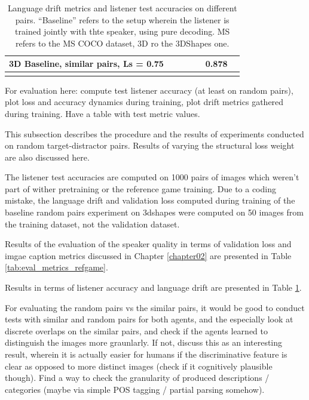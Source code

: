 \begin{table}[]
\begin{tabularx}{\textwidth}{|X|l|l|X|X|X|X|}
		3D Baseline, similar pairs, Ls = 0.75 &                   &                        &                      &                      & 0.878                                    &                                           \\ \hline
		&                   &                        &                      &                      &                                          &                                           \\ \hline
	\end{tabularx}
\caption{\label{tab:drift_metrics_basic} Language drift metrics and listener test accuracies on different pairs. 
	``Baseline'' refers to the setup wherein the listener is trained jointly with thte speaker, using pure decoding. MS refers to the MS COCO dataset, 3D ro the 3DShapes one. }
\end{table}

For evaluation here: compute test listener accuracy (at least on random pairs), plot loss and accuracy dynamics during training, plot drift metrics gathered during training. Have a table with test metric values.

This subsection describes the procedure and the results of experiments conducted on random target-distractor pairs. Results of varying the structural loss weight are also discussed here.

The listener test accuracies are computed on 1000 pairs of images which weren't part of wither pretraining or the reference game training.
Due to a coding mistake, the language drift and validation loss computed during training of the baseline random pairs experiment on 3dshapes were computed on 50 images from the training dataset, not the validation dataset. 

Results of the evaluation of the speaker quality in terms of validation loss and imgae caption metrics discussed in Chapter \ref{chapter02} are presented in Table \ref{tab:eval_metrics_refgame}.

Results in terms of listener accuracy and language drift are presented in Table \ref{tab:drift_metrics_basic}.

For evaluating the random pairs vs the similar pairs, it would be good to conduct tests with similar and random pairs for both agents, and the especially look at discrete overlaps on the similar pairs, and check if the agents learned to distinguish the images more graunlarly. If not, discuss this as an interesting result, wherein it is actually easier for humans if the discriminative feature is clear as opposed to more distinct images (check if it cognitively plausible though). Find a way to check the granularity of produced descriptions / categories (maybe via simple POS tagging / partial parsing somehow).

